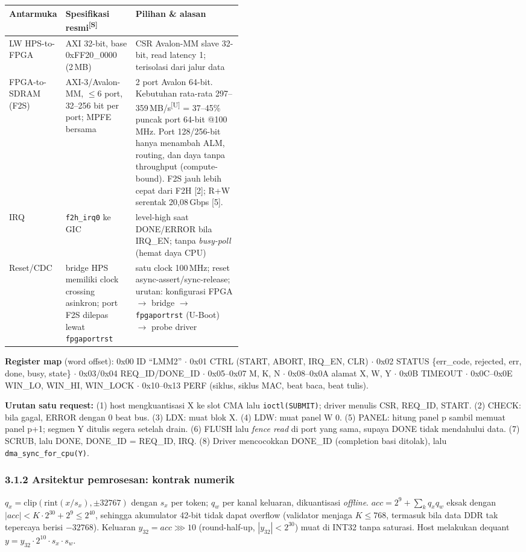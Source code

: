 \documentclass[10pt]{article}
\newcommand{\hd}[1]{\cellcolor{thg}\textbf{#1}}
\newcommand{\code}[1]{\texttt{\small #1}}
\newcommand{\U}{\textsuperscript{[U]}}
\newcommand{\Sx}{\textsuperscript{[S]}}
\begin{document}
{\small
\begin{tabularx}{\linewidth}{|p{0.15\linewidth}|p{0.3\linewidth}|L|}
\hline
\hd{Antarmuka} & \hd{Spesifikasi resmi\Sx} & \hd{Pilihan \& alasan} \\ \hline
LW HPS-to-FPGA & AXI 32-bit, base 0xFF20\_0000 (2\,MB) & CSR Avalon-MM slave 32-bit, read latency 1; terisolasi dari jalur data \\ \hline
FPGA-to-SDRAM (F2S) & AXI-3/Avalon-MM, $\le$6 port, 32--256 bit per port; MPFE bersama & 2 port Avalon 64-bit. Kebutuhan rata-rata 297--359\,MB/s\U{} = 37--45\% puncak port 64-bit @100\,MHz. Port 128/256-bit hanya menambah ALM, routing, dan daya tanpa throughput (compute-bound). F2S jauh lebih cepat dari F2H [2]; R+W serentak 20,08\,Gbps [5]. \\ \hline
IRQ & \code{f2h\_irq0} ke GIC & level-high saat DONE/ERROR bila IRQ\_EN; tanpa \emph{busy-poll} (hemat daya CPU) \\ \hline
Reset/CDC & bridge HPS memiliki clock crossing asinkron; port F2S dilepas lewat \code{fpgaportrst} & satu clock 100\,MHz; reset async-assert/sync-release; urutan: konfigurasi FPGA $\rightarrow$ bridge $\rightarrow$ \code{fpgaportrst} (U-Boot) $\rightarrow$ probe driver \\ \hline
\end{tabularx}}

\textbf{Register map} (word offset): 0x00 ID ``LMM2'' $\cdot$ 0x01 CTRL (START, ABORT, IRQ\_EN, CLR) $\cdot$ 0x02 STATUS \{err\_code, rejected, err, done, busy, state\} $\cdot$ 0x03/0x04 REQ\_ID/DONE\_ID $\cdot$ 0x05--0x07 M, K, N $\cdot$ 0x08--0x0A alamat X, W, Y $\cdot$ 0x0B TIMEOUT $\cdot$ 0x0C--0x0E WIN\_LO, WIN\_HI, WIN\_LOCK $\cdot$ 0x10--0x13 PERF (siklus, siklus MAC, beat baca, beat tulis).

\textbf{Urutan satu request:} (1) host mengkuantisasi X ke slot CMA lalu \code{ioctl(SUBMIT)}; driver menulis CSR, REQ\_ID, START. (2) CHECK: bila gagal, ERROR dengan 0 beat bus. (3) LDX: muat blok X. (4) LDW: muat panel W 0. (5) PANEL: hitung panel p sambil memuat panel p+1; segmen Y ditulis segera setelah drain. (6) FLUSH lalu \emph{fence read} di port yang sama, supaya DONE tidak mendahului data. (7) SCRUB, lalu DONE, DONE\_ID = REQ\_ID, IRQ. (8) Driver mencocokkan DONE\_ID (completion basi ditolak), lalu \code{dma\_sync\_for\_cpu(Y)}.

\subsubsection{3.1.2 Arsitektur pemrosesan: kontrak numerik}
$q_x = \mathrm{clip}(\mathrm{rint}(x/s_x), \pm 32767)$ dengan $s_x$ per token; $q_w$ per kanal keluaran, dikuantisasi \emph{offline}. $\mathit{acc} = 2^9 + \sum_k q_x q_w$ eksak dengan $|\mathit{acc}| < K\cdot 2^{30} + 2^9 \le 2^{40}$, sehingga akumulator 42-bit tidak dapat overflow (validator menjaga $K \le 768$, termasuk bila data DDR tak tepercaya berisi $-32768$). Keluaran $y_{32} = \mathit{acc} \ggg 10$ (round-half-up, $|y_{32}| < 2^{30}$) muat di INT32 tanpa saturasi. Host melakukan dequant $y = y_{32}\cdot 2^{10}\cdot s_x\cdot s_w$.
\end{document}
